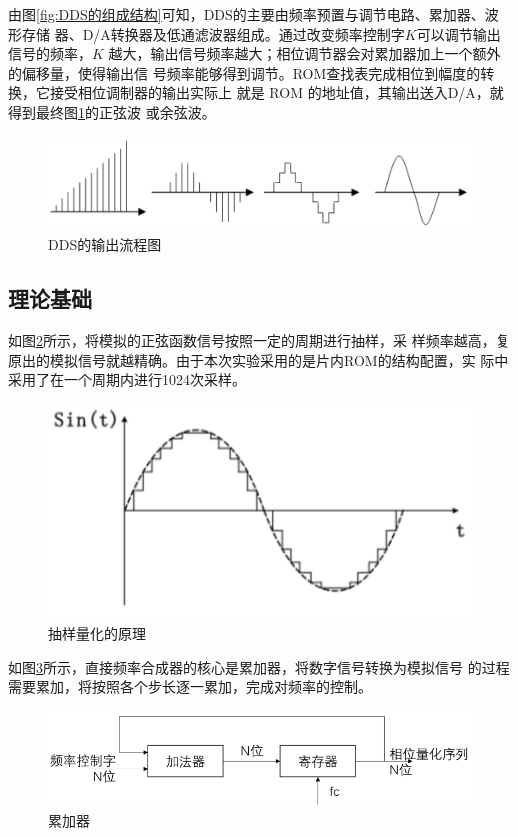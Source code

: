 \documentclass[twoside, openright]{article}
\begin{document}
由图\ref{fig:DDS的组成结构}可知，DDS的主要由频率预置与调节电路、累加器、波形存储
器、D/A转换器及低通滤波器组成。通过改变频率控制字$ K $可以调节输出信号的频率，$
K $ 越大，输出信号频率越大；相位调节器会对累加器加上一个额外的偏移量，使得输出信
号频率能够得到调节。ROM查找表完成相位到幅度的转换，它接受相位调制器的输出实际上
就是 ROM 的地址值，其输出送入D/A，就得到最终图\ref{fig:DDS的输出流程图}的正弦波
或余弦波。

\begin{figure}[htbp]
	\centering
	\includegraphics[width=0.8\linewidth]{dia.png}
	\caption{DDS的输出流程图}
	\label{fig:DDS的输出流程图}
\end{figure}

\subsection{理论基础}%
\label{sub:理论基础}

如图\ref{fig:抽样量化的原理}所示，将模拟的正弦函数信号按照一定的周期进行抽样，采
样频率越高，复原出的模拟信号就越精确。由于本次实验采用的是片内ROM的结构配置，实
际中采用了在一个周期内进行1024次采样。

\begin{figure}[htbp]
	\centering
	\includegraphics[width=0.8\linewidth]{sample.png}
	\caption{抽样量化的原理}
	\label{fig:抽样量化的原理}
\end{figure}

如图\ref{fig:累加器}所示，直接频率合成器的核心是累加器，将数字信号转换为模拟信号
的过程需要累加，将按照各个步长逐一累加，完成对频率的控制。

\begin{figure}[htbp]
	\centering
	\includegraphics[width=0.8\linewidth]{accumulator.png}
	\caption{累加器}
	\label{fig:累加器}
\end{figure}
\end{document}
